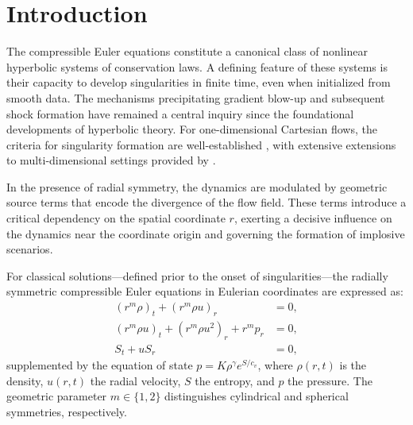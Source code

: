 \documentclass[11pt]{article}
\begin{document}
\section{Introduction}\label{sec:introduction}

The compressible Euler equations constitute a canonical class of nonlinear hyperbolic systems of conservation laws. A defining feature of these systems is their capacity to develop singularities in finite time, even when initialized from smooth data. The mechanisms precipitating gradient blow-up and subsequent shock formation have remained a central inquiry since the foundational developments of hyperbolic theory. For one-dimensional Cartesian flows, the criteria for singularity formation are well-established \cite{lax2, Liu1, CPZ, G9, G10, CCZ, CY, CYZ}, with extensive extensions to multi-dimensional settings provided by \cite{Ali, Schen, Kong, sideris, CCY, Christodoulou1, Christodoulou2, Speck1, Speck2, Speck3}. 

In the presence of radial symmetry, the dynamics are modulated by geometric source terms that encode the divergence of the flow field. These terms introduce a critical dependency on the spatial coordinate $r$, exerting a decisive influence on the dynamics near the coordinate origin and governing the formation of implosive scenarios.

For classical solutions---defined prior to the onset of singularities---the radially symmetric compressible Euler equations in Eulerian coordinates are expressed as:
\begin{align}
    (r^m\rho)_t + (r^m\rho u)_r &= 0, \\
    (r^m\rho u)_t + (r^m\rho u^2)_r + r^m p_r &= 0, \\
    S_t + uS_r &= 0,
\end{align}
supplemented by the equation of state $p = K\rho^\gamma e^{S/c_v}$, where $\rho(r,t)$ is the density, $u(r,t)$ the radial velocity, $S$ the entropy, and $p$ the pressure. The geometric parameter $m \in \{1, 2\}$ distinguishes cylindrical and spherical symmetries, respectively. 
\end{document}
